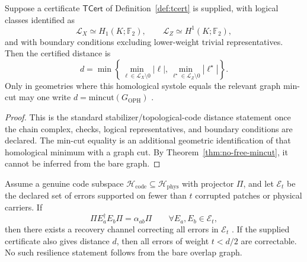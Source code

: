 \begin{theorem}
\label{thm:tcert-distance}
Suppose a certificate \(\mathsf{TCert}\) of Definition~\ref{def:tcert} is supplied, with logical
classes identified as
\[
\mathcal L_X\simeq H_1(K;\mathbb F_2),
\qquad
\mathcal L_Z\simeq H^1(K;\mathbb F_2),
\]
and with boundary conditions excluding lower-weight trivial representatives. Then the certified
distance is
\[
d=
\min\left\{
\min_{\ell\in\mathcal L_X\setminus0}|\ell|,
\min_{\ell^\star\in\mathcal L_Z\setminus0}|\ell^\star|
\right\}.
\]
Only in geometries where this homological systole equals the relevant graph min-cut may one write
\(d=\mathrm{mincut}(G_{\mathrm{OPH}})\) \cite{Kitaev2003,Dennis2002}.
\end{theorem}

\begin{proof}
This is the standard stabilizer/topological-code distance statement once the chain complex,
checks, logical representatives, and boundary conditions are declared. The min-cut equality is an
additional geometric identification of that homological minimum with a graph cut. By
Theorem~\ref{thm:no-free-mincut}, it cannot be inferred from the bare graph.
\end{proof}

\begin{theorem}
\label{thm:qecc}
Assume a genuine code subspace \(\mathcal H_{\mathrm{code}}\subseteq\mathcal H_{\mathrm{phys}}\)
with projector \(\Pi\), and let \(\mathcal E_t\) be the declared set of errors supported on fewer
than \(t\) corrupted patches or physical carriers. If
\[
\Pi E_a^\dagger E_b \Pi=\alpha_{ab}\Pi
\qquad
\forall E_a,E_b\in\mathcal E_t,
\]
then there exists a recovery channel correcting all errors in \(\mathcal E_t\)
\cite{KL97}. If the supplied certificate also gives distance \(d\), then all errors of weight
\(t<d/2\) are correctable. No such resilience statement follows from the bare overlap graph.
\end{theorem}
